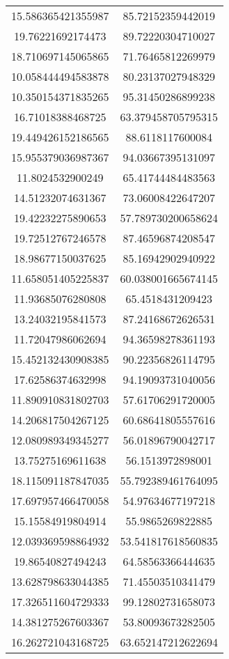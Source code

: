 \begin{table}
\begin{tabular}{cc}
15.586365421355987 & 85.72152359442019 \\
19.76221692174473 & 89.72220304710027 \\
18.710697145065865 & 71.76465812269979 \\
10.058444494583878 & 80.23137027948329 \\
10.350154371835265 & 95.31450286899238 \\
16.71018388468725 & 63.379458705795315 \\
19.449426152186565 & 88.6118117600084 \\
15.955379036987367 & 94.03667395131097 \\
11.8024532900249 & 65.41744484483563 \\
14.51232074631367 & 73.06008422647207 \\
19.42232275890653 & 57.789730200658624 \\
19.72512767246578 & 87.46596874208547 \\
18.98677150037625 & 85.16942902940922 \\
11.658051405225837 & 60.038001665674145 \\
11.93685076280808 & 65.4518431209423 \\
13.24032195841573 & 87.24168672626531 \\
11.72047986062694 & 94.36598278361193 \\
15.452132430908385 & 90.22356826114795 \\
17.62586374632998 & 94.19093731040056 \\
11.890910831802703 & 57.61706291720005 \\
14.206817504267125 & 60.68641805557616 \\
12.080989349345277 & 56.01896790042717 \\
13.75275169611638 & 56.1513972898001 \\
18.115091187847035 & 55.792389461764095 \\
17.697957466470058 & 54.97634677197218 \\
15.15584919804914 & 55.9865269822885 \\
12.039369598864932 & 53.541817618560835 \\
19.86540827494243 & 64.58563366444635 \\
13.628798633044385 & 71.45503510341479 \\
17.326511604729333 & 99.12802731658073 \\
14.381275267603367 & 53.80093673282505 \\
16.262721043168725 & 63.652147212622694 \\

\end{tabular}
\end{table}
